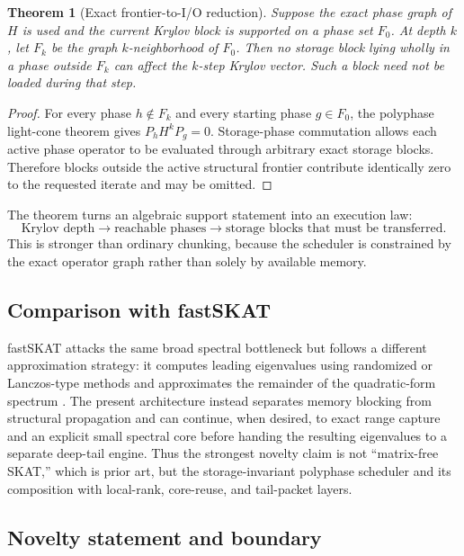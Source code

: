 \documentclass[11pt]{article}
\newtheorem{theorem}{Theorem}[section]
\theoremstyle{definition}
\theoremstyle{remark}
\begin{document}
\begin{theorem}[Exact frontier-to-I/O reduction]
Suppose the exact phase graph of $H$ is used and the current Krylov block is
supported on a phase set $F_0$.  At depth $k$, let $F_k$ be the graph
$k$-neighborhood of $F_0$.  Then no storage block lying wholly in a phase
outside $F_k$ can affect the $k$-step Krylov vector.  Such a block need not be
loaded during that step.
\end{theorem}

\begin{proof}
For every phase $h\notin F_k$ and every starting phase $g\in F_0$, the
polyphase light-cone theorem gives $P_hH^kP_g=0$.  Storage-phase commutation
allows each active phase operator to be evaluated through arbitrary exact
storage blocks.  Therefore blocks outside the active structural frontier
contribute identically zero to the requested iterate and may be omitted.
\end{proof}

The theorem turns an algebraic support statement into an execution law:
\[
\boxed{
\text{Krylov depth}
\longrightarrow
\text{reachable phases}
\longrightarrow
\text{storage blocks that must be transferred}.
}
\]
This is stronger than ordinary chunking, because the scheduler is constrained
by the exact operator graph rather than solely by available memory.

\subsection{Comparison with fastSKAT}

fastSKAT attacks the same broad spectral bottleneck but follows a different
approximation strategy: it computes leading eigenvalues using randomized or
Lanczos-type methods and approximates the remainder of the quadratic-form
spectrum \cite{Lumley2018}.  The present architecture instead separates
memory blocking from structural propagation and can continue, when desired,
to exact range capture and an explicit small spectral core before handing the
resulting eigenvalues to a separate deep-tail engine.  Thus the strongest
novelty claim is not ``matrix-free SKAT,'' which is prior art, but the
storage-invariant polyphase scheduler and its composition with local-rank,
core-reuse, and tail-packet layers.

\subsection{Novelty statement and boundary}
\end{document}
